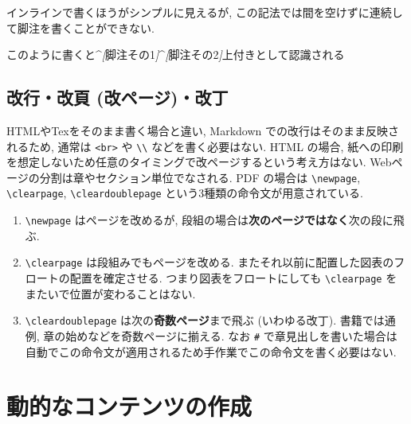 \documentclass[
]{bxjsbook}
\newenvironment{Shaded}{\begin{snugshade}}{\end{snugshade}}
\newcommand{\CommentTok}[1]{\textcolor[rgb]{0.56,0.35,0.01}{\textit{#1}}}
\newcommand{\NormalTok}[1]{#1}
\newcommand{\OtherTok}[1]{\textcolor[rgb]{0.56,0.35,0.01}{#1}}
\providecommand{\tightlist}{%
  \setlength{\itemsep}{0pt}\setlength{\parskip}{0pt}}
\theoremstyle{definition}
\theoremstyle{definition}
\theoremstyle{definition}
\theoremstyle{remark}
\begin{document}
インラインで書くほうがシンプルに見えるが,
この記法では間を空けずに連続して脚注を書くことができない.

\begin{Shaded}
\begin{Highlighting}[]
\NormalTok{このように書くと\^{}}\CommentTok{[}\OtherTok{脚注その1}\CommentTok{]}\NormalTok{\^{}}\CommentTok{[}\OtherTok{脚注その2}\CommentTok{]}\NormalTok{上付きとして認識される}
\end{Highlighting}
\end{Shaded}

\hypertarget{ux6539ux884cux6539ux9801-ux6539ux30daux30fcux30b8ux6539ux4e01}{%
\section{改行・改頁
(改ページ)・改丁}\label{ux6539ux884cux6539ux9801-ux6539ux30daux30fcux30b8ux6539ux4e01}}

HTMLやTexをそのまま書く場合と違い, Markdown
での改行はそのまま反映されるため, 通常は
\texttt{\textless{}br\textgreater{}} や
\texttt{\textbackslash{}\textbackslash{}} などを書く必要はない. HTML
の場合,
紙への印刷を想定しないため任意のタイミングで改ページするという考え方はない.
Webページの分割は章やセクション単位でなされる. PDF の場合は
\texttt{\textbackslash{}newpage}, \texttt{\textbackslash{}clearpage},
\texttt{\textbackslash{}cleardoublepage}
という3種類の命令文が用意されている.

\begin{enumerate}
\def\labelenumi{\arabic{enumi}.}
\tightlist
\item
  \texttt{\textbackslash{}newpage} はページを改めるが,
  段組の場合は\textbf{次のページではなく}次の段に飛ぶ.
\item
  \texttt{\textbackslash{}clearpage} は段組みでもページを改める.
  またそれ以前に配置した図表のフロートの配置を確定させる.
  つまり図表をフロートにしても \texttt{\textbackslash{}clearpage}
  をまたいで位置が変わることはない.
\item
  \texttt{\textbackslash{}cleardoublepage}
  は次の\textbf{奇数ページ}まで飛ぶ (いわゆる改丁). 書籍では通例,
  章の始めなどを奇数ページに揃える. なお \texttt{\#}
  で章見出しを書いた場合は自動でこの命令文が適用されるため手作業でこの命令文を書く必要はない.
\end{enumerate}

\hypertarget{ux52d5ux7684ux306aux30b3ux30f3ux30c6ux30f3ux30c4ux306eux4f5cux6210}{%
\chapter{動的なコンテンツの作成}\label{ux52d5ux7684ux306aux30b3ux30f3ux30c6ux30f3ux30c4ux306eux4f5cux6210}}
\end{document}
